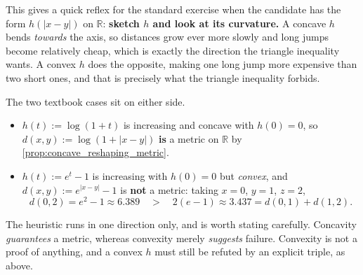 \begin{remark}
\label{rem:concave_vs_convex_distance}
This gives a quick reflex for the standard exercise  when the candidate has
the form $h(\lvert x-y\rvert)$ on $\mathbb{R}$: \textbf{sketch $h$ and look at its curvature.}
A concave $h$ bends \emph{towards} the axis, so distances grow ever more slowly and long jumps
become relatively cheap, which is exactly the direction the triangle inequality wants. A convex
$h$ does the opposite, making one long jump more expensive than two short ones, and that is
precisely what the triangle inequality forbids.

The two textbook cases sit on either side.
\begin{itemize}
  \item $h(t) := \log(1+t)$ is increasing and concave with $h(0)=0$, so
    $d(x,y) := \log(1+\lvert x-y\rvert)$ \textbf{is} a metric on $\mathbb{R}$ by
    \cref{prop:concave_reshaping_metric}.
  \item $h(t) := e^{t}-1$ is increasing with $h(0)=0$ but \emph{convex}, and
    $d(x,y) := e^{\lvert x-y\rvert}-1$ is \textbf{not} a metric: taking $x=0$, $y=1$, $z=2$,
    \[d(0,2) = e^2-1 \approx 6.389 \quad>\quad 2(e-1) \approx 3.437 = d(0,1)+d(1,2).\]
\end{itemize}
The heuristic runs in one direction only, and is worth stating carefully. Concavity
\emph{guarantees} a metric, whereas convexity merely \emph{suggests} failure. Convexity is not a
proof of anything, and a convex $h$ must still be refuted by an explicit triple, as above.


\end{remark}
